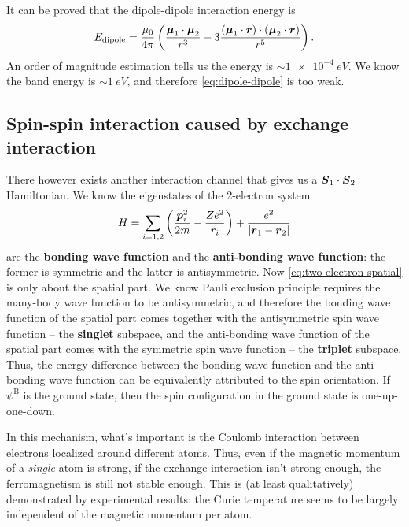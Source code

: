 \documentclass[hyperref, a4paper]{article}
\newcommand*{\concept}[1]{{\textbf{#1}}}
\begin{document}
It can be proved that the dipole-dipole interaction energy is 
\begin{equation}
    E_{\text{dipole}} = 
    \frac{\mu_0}{4\pi}
    \left(
        \frac{\vb*{\mu}_1 \cdot \vb*{\mu}_2}{r^3}
        - 3 \frac{(\vb*{\mu}_1 \cdot \vb*{r}) \cdot (\vb*{\mu}_2 \cdot \vb*{r})}{r^5}
    \right).
    \label{eq:dipole-dipole}
\end{equation}
An order of magnitude estimation tells us the energy is $\sim \SI{1e-4}{eV}$.
We know the band energy is $\sim \SI{1}{eV}$,
and therefore \eqref{eq:dipole-dipole} is too weak.

\subsection{Spin-spin interaction caused by exchange interaction}

There however exists another interaction channel 
that gives us a $\vb*{S}_1 \cdot \vb*{S}_2$ Hamiltonian.
We know the eigenstates of the 2-electron system 
\begin{equation}
    H = \sum_{i = 1,2 } \left(
        \frac{\vb*{p}_i^2}{2m} - \frac{Z e^2}{r_i}
    \right)
    + \frac{e^2}{\abs{\vb*{r}_1 - \vb*{r}_2}}   
    \label{eq:two-electron-spatial}
\end{equation}
are the \concept{bonding wave function} and the \concept{anti-bonding wave function}:
the former is symmetric and the latter is antisymmetric.
Now \eqref{eq:two-electron-spatial} is only about the spatial part.
We know Pauli exclusion principle requires the many-body wave function 
to be antisymmetric,
and therefore the bonding wave function of the spatial part 
comes together with the antisymmetric spin wave function -- the \concept{singlet} subspace,
and the anti-bonding wave function of the spatial part 
comes with the symmetric spin wave function -- the \concept{triplet} subspace.
Thus, the energy difference between the bonding wave function and the anti-bonding wave function 
can be equivalently attributed to the spin orientation.
If $\psi^\text{B}$ is the ground state, 
then the spin configuration in the ground state is one-up-one-down.

In this mechanism, 
what's important is the Coulomb interaction between electrons localized around different atoms.
Thus, even if the magnetic momentum of a \emph{single} atom is strong,
if the exchange interaction isn't strong enough,
the ferromagnetism is still not stable enough.
This is (at least qualitatively) demonstrated by experimental results:
the Curie temperature seems to be largely 
independent of the magnetic momentum per atom.
\end{document}

